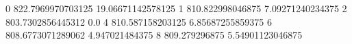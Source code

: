 0 822.7969970703125 19.06671142578125
1 810.822998046875 7.09271240234375
2 803.7302856445312 0.0
4 810.587158203125 6.85687255859375
6 808.6773071289062 4.947021484375
8 809.279296875 5.54901123046875

